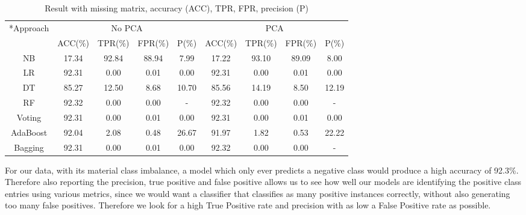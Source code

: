 \documentclass{article}
\def\abovestrut#1{\rule[0in]{0in}{#1}\ignorespaces}
\def\belowstrut#1{\rule[-#1]{0in}{#1}\ignorespaces}
\def\abovespace{\abovestrut{0.20in}}
\def\belowspace{\belowstrut{0.10in}}
\begin{document}
\begin{table}[htbp]
\begin{center}
\begin{small}
\begin{sc}
\begin{tabular}{c|cccc|cccc}
\hline
\hline
\abovespace\belowspace
\multirow{2}*{Approach} & \multicolumn{4}{c|}{No PCA} & \multicolumn{4}{c}{PCA} \\ \cline{2-9}
\abovespace\belowspace
 & ACC(\%) & TPR(\%) & FPR(\%) & P(\%) & ACC(\%) & TPR(\%) & FPR(\%) & P(\%) \\
\hline
\abovespace
NB & 17.34 & 92.84 & 88.94 & 7.99 & 17.22 & 93.10 & 89.09 & 8.00 \\
LR & 92.31 & 0.00 & 0.01 & 0.00 & 92.31 & 0.00 & 0.01 & 0.00 \\
DT & 85.27 & 12.50 & 8.68 & 10.70 & 85.56 & 14.19 & 8.50 & 12.19 \\
RF & 92.32 & 0.00 & 0.00 & - & 92.32 & 0.00 & 0.00 & - \\
Voting & 92.31 & 0.00 & 0.01 & 0.00 & 92.31 & 0.00 & 0.01 & 0.00 \\
AdaBoost & 92.04 & 2.08 & 0.48 & 26.67 & 91.97 & 1.82 & 0.53 & 22.22 \\
\belowspace
Bagging & 92.31 & 0.00 & 0.01 & 0.00 & 92.32 & 0.00 & 0.00 & - \\
\hline
\hline
\end{tabular}
\end{sc}
\end{small}
\newline
\caption{Result with missing matrix, accuracy (ACC), TPR, FPR, precision (P)}
\label{tab:result_miss}
\end{center}
\vskip -3mm
\end{table}

For our data, with its material class imbalance, a model which only ever predicts a negative class would produce a high accuracy of 92.3\%.
Therefore also reporting the precision, true positive and false positive allows us to see how well our models are identifying the positive class entries using various metrics, since we would want a classifier that classifies as many positive instances correctly, without also generating too many false positives.
Therefore we look for a high True Positive rate and precision with as low a False Positive rate as possible.
\end{document}

